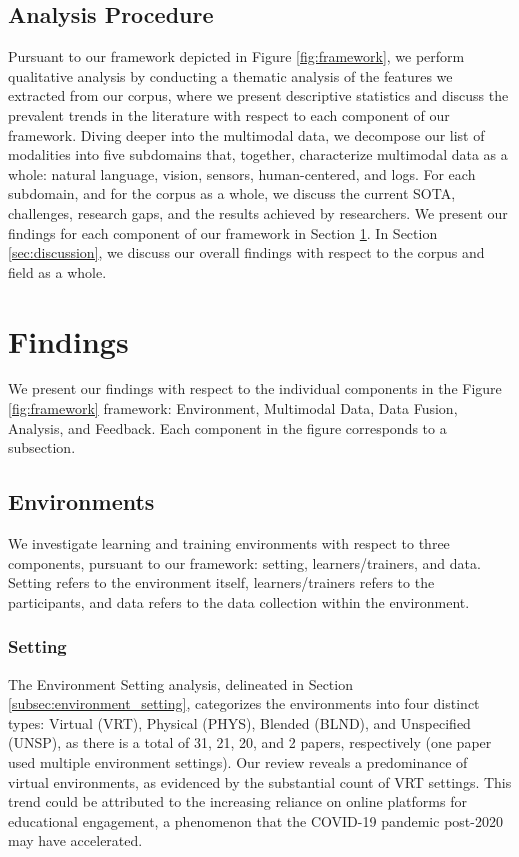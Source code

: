 \documentclass[manuscript,screen,review]{acmart}
\begin{document}
\subsection{Analysis Procedure} \label{subsec:analysis_procedure}

Pursuant to our framework depicted in Figure \ref{fig:framework}, we perform qualitative analysis by conducting a thematic analysis of the features we extracted from our corpus, where we present descriptive statistics and discuss the prevalent trends in the literature with respect to each component of our framework. Diving deeper into the multimodal data, we decompose our list of modalities into five subdomains that, together, characterize multimodal data as a whole: natural language, vision, sensors, human-centered, and logs. For each subdomain, and for the corpus as a whole, we discuss the current SOTA, challenges, research gaps, and the results achieved by researchers. We present our findings for each component of our framework in Section \ref{sec:findings}. In Section \ref{sec:discussion}, we discuss our overall findings with respect to the corpus and field as a whole.

\section{Findings}\label{sec:findings}
We present our findings with respect to the individual components in the Figure \ref{fig:framework} framework: Environment, Multimodal Data, Data Fusion, Analysis, and Feedback. Each component in the figure corresponds to a subsection.

\subsection{Environments}
We investigate learning and training environments with respect to three components, pursuant to our framework: setting, learners/trainers, and data. Setting refers to the environment itself, learners/trainers refers to the participants, and data refers to the data collection within the environment.

\subsubsection{Setting}


The Environment Setting analysis, delineated in Section \ref{subsec:environment_setting}, categorizes the environments into four distinct types: Virtual (VRT), Physical (PHYS), Blended (BLND), and Unspecified (UNSP), as there is a total of 31, 21, 20, and 2 papers, respectively (one paper \cite{3637456466} used multiple environment settings). Our review reveals a predominance of virtual environments, as evidenced by the substantial count of VRT settings. This trend could be attributed to the increasing reliance on online platforms for educational engagement, a phenomenon that the COVID-19 pandemic post-2020 may have accelerated.
\end{document}
